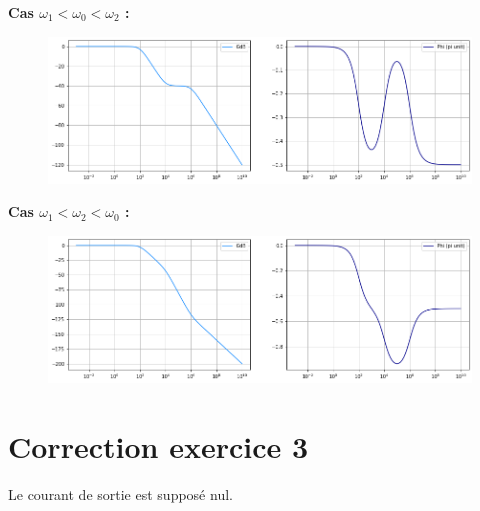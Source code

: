 \documentclass{report}
\begin{document}
\textbf{Cas $\omega_1<\omega_0<\omega_2$ :}
\begin{figure}[!h]
	\centering
	\includegraphics[width=0.8\linewidth]{exo2_1.png}
\end{figure}

\textbf{Cas $\omega_1<\omega_2<\omega_0$ :}
\begin{figure}[!h]
	\centering
	\includegraphics[width=0.8\linewidth]{exo2_2.png}
\end{figure}

\section*{Correction exercice 3}

Le courant de sortie est supposé nul.
\end{document}
